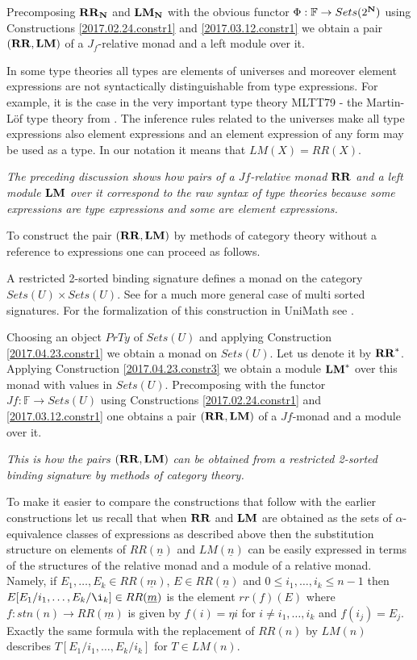 \documentclass[12pt]{amsart}
\newcommand{\sr}{\rightarrow}
\newcommand{\nn}{{\bf N\rm}}
\newcommand{\nat}{\nn}
\newcommand{\uu}{\underline}
\newcommand{\RR}{{\bf RR}}
\newcommand{\LM}{{\bf LM}}
\newcommand{\FF}{{\mathbb F}}
\newcommand{\ff}[1]{\uu{#1}}
\begin{document}
Precomposing $\RR_{\nat}$ and $\LM_{\nat}$ with the obvious functor $\Phi:\FF\sr Sets(2^{\nat})$ using Constructions \ref{2017.02.24.constr1}  and \ref{2017.03.12.constr1} we obtain a pair $(\RR,\LM)$ of a $J_f$-relative monad and a left module over it. 

In some type theories all types are elements of universes and moreover element expressions are not syntactically distinguishable from type expressions. For example, it is the case in the very important type theory MLTT79 - the Martin-L\"{o}f type theory from \cite{MLTT79}. The inference rules related to the universes \cite[p.172]{MLTT79} make all type expressions also element expressions and an element expression of any form may be used as a type. In our notation it means that $LM(X)=RR(X)$.

{\em The preceding discussion shows how pairs of a $Jf$-relative monad $\RR$ and a left module $\LM$ over it correspond to the raw syntax of type theories because some expressions are type expressions and some are element expressions.}

To construct the pair $(\RR,\LM)$ by methods of category theory without a reference to expressions one can proceed as follows.

A restricted 2-sorted binding signature defines a monad on the category $Sets(U)\times Sets(U)$. See \cite{Zsido} for a much more general case of multi sorted signatures. For the formalization of this construction in UniMath see \cite{AMM2017}. 

Choosing an object $PrTy$ of $Sets(U)$ and applying Construction \ref{2017.04.23.constr1} we obtain a monad on $Sets(U)$. Let us denote it by $\RR^*$. Applying Construction \ref{2017.04.23.constr3} we obtain a module $\LM^*$ over this monad with values in $Sets(U)$.  Precomposing with the functor $Jf:\FF\sr Sets(U)$ using Constructions \ref{2017.02.24.constr1}  and \ref{2017.03.12.constr1} one obtains a pair $(\RR,\LM)$ of a $Jf$-monad and a module over it.

{\em This is how the pairs $(\RR,\LM)$ can be obtained from a restricted 2-sorted binding signature by methods of category theory.}

To make it easier to compare the constructions that follow with the earlier constructions let us recall that when $\RR$ and $\LM$ are obtained as the sets of $\alpha$-equivalence classes of expressions as described above then the substitution structure on elements of $RR(\ff{n})$ and $LM(\ff{n})$ can be easily expressed in terms of the structures of the relative monad and a module of a relative monad. Namely, if $E_1,\dots,E_k\in RR(\ff{m})$, $E\in RR(\ff{n})$ and $0\le i_1,\dots,i_k\le n-1$ then $E[E_1/i_1,\dots,E_k/\i_k]\in RR(\ff{m})$ is the element $rr(f)(E)$ where $f:stn(n)\sr RR(\ff{m})$ is given by $f(i)=\eta{i}$ for $i\ne i_1,\dots,i_k$ and $f(i_j)=E_j$. Exactly the same formula with the replacement of $RR(n)$ by $LM(n)$ describes $T[E_1/i_1,\dots,E_k/i_k]$ for $T\in LM(n)$. 
\end{document}
